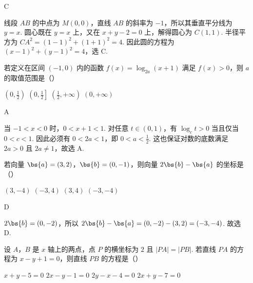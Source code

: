 \begin{answer}
C
\end{answer}

\begin{solution}
线段 \(AB\) 的中点为 \(M(0,0)\)，直线 \(AB\) 的斜率为 \(-1\)，所以其垂直平分线为 \(y=x\). 圆心既在 \(y=x\) 上，又在 \(x+y-2=0\) 上，解得圆心为 \(C(1,1)\). 半径平方为
\(CA^2=(1-1)^2+(1+1)^2=4\). 因此圆的方程为 \((x-1)^2+(y-1)^2=4\)，选 C.
\end{solution}

\begin{problem}
若定义在区间 \((-1,0)\) 内的函数 \(f(x)=\log_{2a}(x+1)\) 满足 \(f(x)>0\)，则 \(a\) 的取值范围是（\quad）

\choices
    {\(\left(0, \frac{1}{2}\right)\)}
    {\(\left(0, \frac{1}{2}\right]\)}
    {\(\left(\frac{1}{2}, +\infty\right)\)}
    {\((0, +\infty)\)}
\end{problem}

\begin{answer}
A
\end{answer}

\begin{solution}
当 \(-1<x<0\) 时，\(0<x+1<1\). 对任意 \(t\in(0,1)\)，有 \(\log_c t>0\) 当且仅当 \(0<c<1\). 因此必须有 \(0<2a<1\)，即 \(0<a<\frac12\). 这也保证对数的底数满足 \(2a>0\) 且 \(2a\neq1\)，故选 A.
\end{solution}

\begin{problem}
若向量 \(\bs{a}=(3,2)\)，\(\bs{b}=(0,-1)\)，则向量 \(2\bs{b}-\bs{a}\) 的坐标是（\quad）

\choices
    {\((3,-4)\)}
    {\((-3,4)\)}
    {\((3,4)\)}
    {\((-3,-4)\)}
\end{problem}

\begin{answer}
D
\end{answer}

\begin{solution}
\(2\bs{b}=(0,-2)\)，所以
\(2\bs{b}-\bs{a}=(0,-2)-(3,2)=(-3,-4)\). 故选 D.
\end{solution}

\begin{problem}
设 \(A\)，\(B\) 是 \(x\) 轴上的两点，点 \(P\) 的横坐标为 \(2\) 且 \(\left|PA\right|=\left|PB\right|\). 若直线 \(PA\) 的方程为 \(x-y+1=0\)，则直线 \(PB\) 的方程是（\quad）

\choices
    {\(x + y - 5 = 0\)}
    {\(2x - y - 1 = 0\)}
    {\(2y - x - 4 = 0\)}
    {\(2x + y - 7 = 0\)}
\end{problem}

